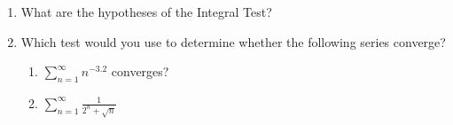 \documentclass{nosvagor-notes}
\begin{document}
\begin{enumerate}
  \item What are the hypotheses of the Integral Test?
  \vspace{110pt}

  \item Which test would you use to determine whether the following series converge?
  \begin{enumerate}
    \item \(\displaystyle \sum_{n=1}^{\infty} n^{-3.2}\) converges?
  \vspace{110pt}

    \item \(\displaystyle \sum_{n=1}^{\infty} \frac{1}{2^n + \sqrt{n} }\)
  \vspace{110pt}
  \end{enumerate}

\end{enumerate}
\end{document}
